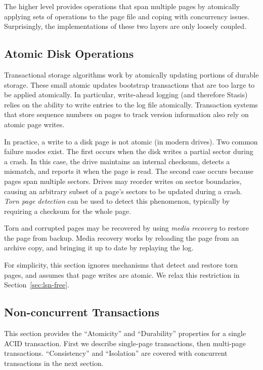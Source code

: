\documentclass[letterpaper,twocolumn,10pt]{article}
\newcommand{\yad}{Stasis\xspace}
\begin{document}
The higher level provides operations that span multiple pages by
atomically applying sets of operations to the page file and coping
with concurrency issues.  Surprisingly, the implementations of these
two layers are only loosely coupled.


\subsection{Atomic Disk Operations}

Transactional storage algorithms work by
atomically updating portions of durable storage.  These small atomic
updates bootstrap transactions that are too large to be
applied atomically.  In particular, write-ahead logging (and therefore
\yad) relies on the ability to write entries to the log
file atomically.  Transaction systems that store sequence numbers on pages to 
track version information also rely on atomic page writes. 

In practice, a write to a disk page is not atomic (in modern drives).  Two common failure
modes exist.  The first occurs when the disk writes a partial sector
during a crash.  In this case, the drive maintains an internal
checksum, detects a mismatch, and reports it when the page is read.
The second case occurs because pages span multiple sectors.  Drives
may reorder writes on sector boundaries, causing an arbitrary subset
of a page's sectors to be updated during a crash.  {\em Torn page
detection} can be used to detect this phenomenon, typically by
requiring a checksum for the whole page. 

Torn and corrupted pages may be recovered by using {\em media
recovery} to restore the page from backup.  Media recovery works by
reloading the page from an archive copy, and bringing it up to date by
replaying the log.

For simplicity, this section ignores mechanisms that detect
and restore torn pages, and assumes that page writes are atomic.
We relax this restriction in Section~\ref{sec:lsn-free}.

\subsection{Non-concurrent Transactions}

This section provides the ``Atomicity'' and ``Durability'' properties
for a single ACID transaction.
First we describe single-page transactions, then multi-page transactions.
``Consistency'' and ``Isolation'' are covered with 
concurrent transactions in the next section.
\end{document}
